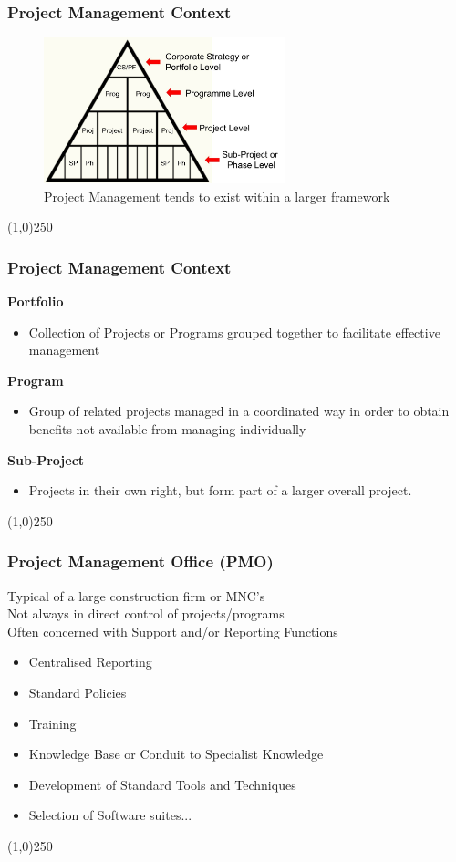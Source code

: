 \begin{frame}
\frametitle{Project Management Context}
 \begin{figure}
 	\centering
 		\includegraphics[width = 7cm]{images/context.jpg}
	\caption{Project Management tends to exist within a larger framework}
 	\label{fig:context}
 \end{figure}
\end{frame}
\begin{center}\line(1,0){250}\end{center}



\begin{frame}
\frametitle{Project Management Context}
\textbf{Portfolio}
\begin{itemize}
	\item Collection of Projects or Programs grouped together to facilitate effective management
\end{itemize}
\textbf{Program}
\begin{itemize}
	\item Group of related projects managed in a coordinated way in order to obtain benefits not available from managing individually
\end{itemize}
\textbf{Sub-Project}
\begin{itemize}
	\item Projects in their own right, but form part of a larger overall project.
\end{itemize}
\end{frame}
\begin{center}\line(1,0){250}\end{center}



\begin{frame}
\frametitle{Project Management Office (PMO)}
Typical of a large construction firm or MNC's\\
Not always in direct control of projects/programs\\
Often concerned with Support and/or Reporting Functions\\
\begin{itemize}
	\item Centralised Reporting
	\item Standard Policies
	\item Training
	\item Knowledge Base or Conduit to Specialist Knowledge
	\item Development of Standard Tools and Techniques
	\item Selection of Software suites...
\end{itemize}
\end{frame}
\begin{center}\line(1,0){250}\end{center}

